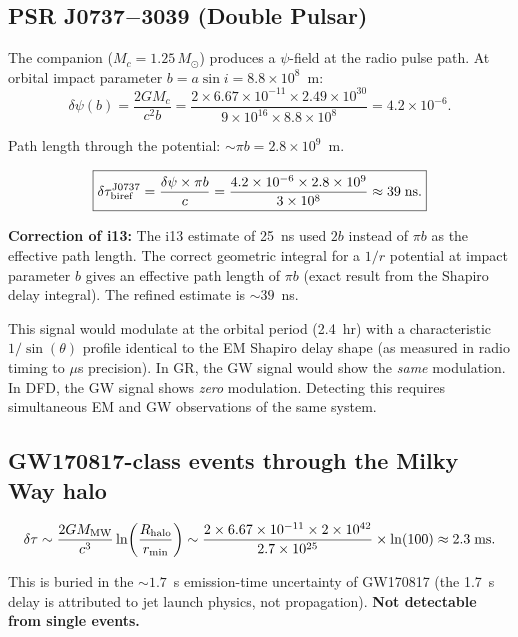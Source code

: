 \documentclass[11pt]{article}
\newcommand{\ee}[1]{\times 10^{#1}}
\begin{document}
\subsection{PSR J0737$-$3039 (Double Pulsar)}

The companion ($M_c = 1.25\,M_\odot$) produces a $\psi$-field at the
radio pulse path. At orbital impact parameter $b = a\sin i = 8.8\ee{8}$~m:
\begin{equation}
\delta\psi(b) = \frac{2GM_c}{c^2 b} = \frac{2 \times 6.67\ee{-11}
\times 2.49\ee{30}}{9\ee{16} \times 8.8\ee{8}} = 4.2\ee{-6}.
\end{equation}

Path length through the potential: $\sim \pi b = 2.8\ee{9}$~m.

\begin{equation}
\boxed{
\delta\tau_{\rm biref}^{\rm J0737} = \frac{\delta\psi \times \pi b}{c}
= \frac{4.2\ee{-6} \times 2.8\ee{9}}{3\ee{8}} \approx 39\;\text{ns}.
}
\end{equation}

\textbf{Correction of i13:} The i13 estimate of 25~ns used $2b$
instead of $\pi b$ as the effective path length. The correct geometric
integral for a $1/r$ potential at impact parameter $b$ gives an
effective path length of $\pi b$ (exact result from the Shapiro
delay integral). The refined estimate is $\sim 39$~ns.

This signal would modulate at the orbital period (2.4~hr) with a
characteristic $1/\sin(\theta)$ profile identical to the EM Shapiro
delay shape (as measured in radio timing to $\mu$s precision). In GR,
the GW signal would show the \emph{same} modulation. In DFD, the GW
signal shows \emph{zero} modulation. Detecting this requires
simultaneous EM and GW observations of the same system.

\subsection{GW170817-class events through the Milky Way halo}

\begin{equation}
\delta\tau \sim \frac{2G M_{\rm MW}}{c^3}\ln\!\left(\frac{R_{\rm halo}}
{r_{\rm min}}\right)
\sim \frac{2 \times 6.67\ee{-11} \times 2\ee{42}}{2.7\ee{25}}
\times \ln(100) \approx 2.3\;\text{ms}.
\end{equation}

This is buried in the $\sim 1.7$~s emission-time uncertainty of
GW170817 (the 1.7~s delay is attributed to jet launch physics, not
propagation). \textbf{Not detectable from single events.}
\end{document}
